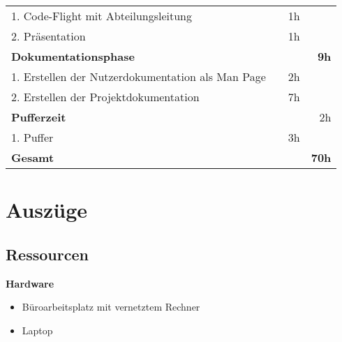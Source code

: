 \begin{table}[!htp]
\begin{tabular}{|lrrr|}
1. Code-Flight mit Abteilungsleitung                               &                                  & 1h                               &                                               \\
\rowcolor[HTML]{BBDAFF}
2. Präsentation                                                    &                                  & 1h                               &                                               \\ \hline
\rowcolor[HTML]{9698ED}
{\color[HTML]{FFFFFF} \textbf{Dokumentationsphase}}              & {\color[HTML]{FFFFFF} }          & {\color[HTML]{FFFFFF} }          & {\color[HTML]{FFFFFF} \textbf{9h}}          \\ \hline
1. Erstellen der Nutzerdokumentation als Man Page                  &                                  & 2h                               &                                               \\
\rowcolor[HTML]{BBDAFF}
2. Erstellen der Projektdokumentation                              &                                  & 7h                               &                                               \\ \hline
\rowcolor[HTML]{9698ED}
{\color[HTML]{FFFFFF} \textbf{Pufferzeit}}                                  & {\color[HTML]{FFFFFF} }          & {\color[HTML]{FFFFFF} }          & {\color[HTML]{FFFFFF} 2h}                     \\ \hline
1. Puffer                                                          &                                  & 3h                               &                                               \\ \hline
\rowcolor[HTML]{9698ED}
{\color[HTML]{FFFFFF} \textbf{Gesamt}}                           & {\color[HTML]{FFFFFF} }          & {\color[HTML]{FFFFFF} }          & {\color[HTML]{FFFFFF} \textbf{70h}}         \\ \hline
\end{tabular}
\end{table}


\clearpage
\section{Auszüge}
\label{sec:textAuszüge}
\subsection{Ressourcen}
\label{auszug:ressourcen}
\textbf{Hardware}
\begin{itemize}
    \item Büroarbeitsplatz mit vernetztem Rechner
    \item Laptop
\end{itemize}

